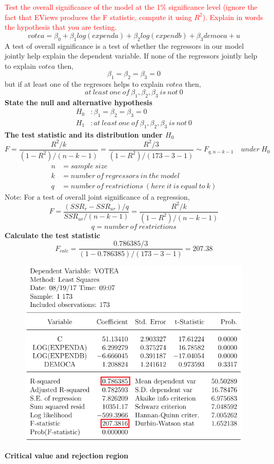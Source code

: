 \documentclass[12pt]{report}
\begin{document}
\noindent \textcolor{red}
{
	Test the overall significance of the model at the 1\% significance level (ignore the fact that EViews produces the F statistic, compute it using $R^2$). Explain in words the hypothesis that you are testing.
}
$$votea = \beta_0 + \beta_1log(expenda) + \beta_2log(expendb) + \beta_3democa + u $$
\noindent A test of overall significance is a test of whether the regressors in our model jointly help explain the dependent variable. If none of the regressors jointly help to explain $votea$ then,
$$\beta_1 = \beta_2 = \beta_3 = 0$$
but if at least one of the regresors helps to explain $votea$ then,
$$at\ least\ one\ of\ \beta_1, \beta_2, \beta_3\ is\ not\ 0$$
\noindent \textbf{State the null and alternative hypothesis}
\begin{align*}
	H_0&: \beta_1 = \beta_2 = \beta_3 = 0 \\
	H_1&: at\ least\ one\ of\ \beta_1, \beta_2, \beta_3\ is\ not\ 0
\end{align*}
\noindent \textbf{The test statistic and its distribution under $H_0$}
$$F = \dfrac{R^{2}/k}{(1-R^2)/(n-k-1)} = \dfrac{R^{2}/3}{(1-R^2)/(173-3-1)} \sim F_{q,n-k-1} \quad under\ H_0$$
\begin{align*}
	n &= sample\ size \\
	k &= number\ of\ regressors\ in\ the\ model \\
	q &= number\ of\ restrictions\ (here\ it\ is\ equal\ to\ k)
\end{align*}
\noindent Note: For a test of overall joint significance of a regression,
$$F = \dfrac{(SSR_r - SSR_{ur})/q}{SSR_{ur}/(n-k-1)} = \dfrac{R^{2}/k}{(1-R^2)/(n-k-1)}$$
$$q = number\ of\ restrictions$$
\noindent \textbf{Calculate the test statistic}
$$F_{calc} = \dfrac{0.786385/3}{(1-0.786385)/(173-3-1)} = 207.38 $$
\begin{figure}[H]
	\centering
	\includegraphics{q1_4}
\end{figure}
\vspace{-\baselineskip}
\noindent \textbf{Critical value and rejection region}
\end{document}

